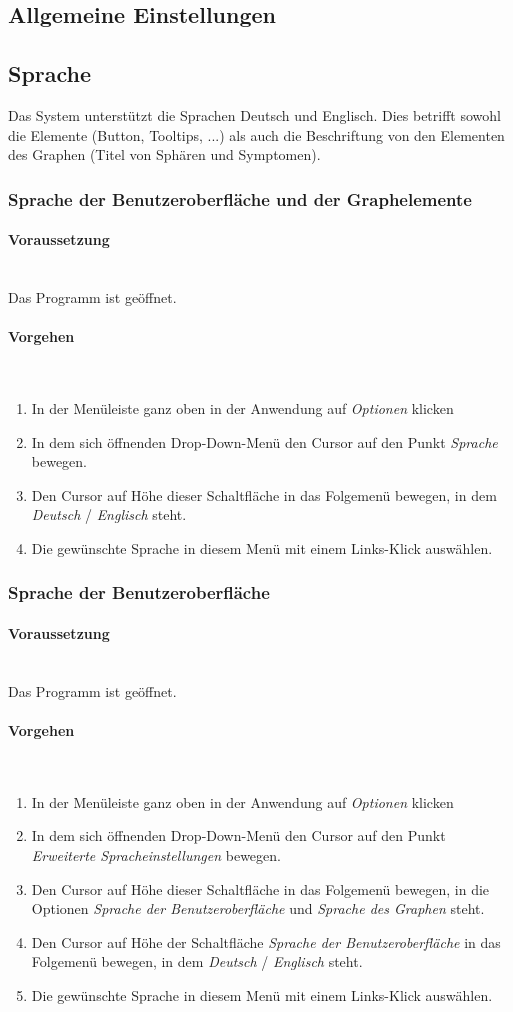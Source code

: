 \documentclass[enabledeprecatedfontcommands,fontsize=11pt,paper=a4,twoside]{scrartcl}
\newcounter{one}
\newcommand*{\condition}{\paragraph{Voraussetzung}$\;$ \vspace{0.2cm}\\}
\newcommand*{\actions}{\paragraph{Vorgehen} $\;$\vspace{0.2cm}\\}
\begin{document}
	\subsection{Allgemeine Einstellungen} \label{settings}
	
		\subsection{Sprache}
		Das System unterstützt die Sprachen Deutsch und Englisch. Dies betrifft sowohl die Elemente (Button, Tooltips, ...) als auch die Beschriftung von den Elementen des Graphen (Titel von Sphären und Symptomen).
	
						\newpage
		\subsubsection{Sprache der Benutzeroberfläche und der Graphelemente}
		\condition 	
		Das Programm ist geöffnet.
		\actions
		\begin{enumerate}
				\item In der Menüleiste ganz oben in der Anwendung auf \textit{Optionen} klicken 
				\item In dem sich öffnenden Drop-Down-Menü den Cursor auf den Punkt \textit{Sprache} bewegen.
				\item Den Cursor auf Höhe dieser Schaltfläche in das Folgemenü bewegen, in dem \textit{Deutsch} / \textit{Englisch} steht.
				\item Die gewünschte Sprache in diesem Menü mit einem Links-Klick auswählen.
		\end{enumerate}

						\newpage
	 				\subsubsection{Sprache der Benutzeroberfläche}
		\condition 	
		Das Programm ist geöffnet.
		\actions
		\begin{enumerate}
				\item In der Menüleiste ganz oben in der Anwendung auf \textit{Optionen} klicken 
				\item In dem sich öffnenden Drop-Down-Menü den Cursor auf den Punkt \textit{Erweiterte Spracheinstellungen} bewegen.
				\item Den Cursor auf Höhe dieser Schaltfläche in das Folgemenü bewegen, in die Optionen \textit{Sprache der Benutzeroberfläche} und \textit{Sprache des Graphen} steht.
				\item Den Cursor auf Höhe der Schaltfläche \textit{Sprache der Benutzeroberfläche} in das Folgemenü bewegen, in dem \textit{Deutsch} / \textit{Englisch} steht.
				\item Die gewünschte Sprache in diesem Menü mit einem Links-Klick auswählen.
		\end{enumerate}
	 		
\end{document}
